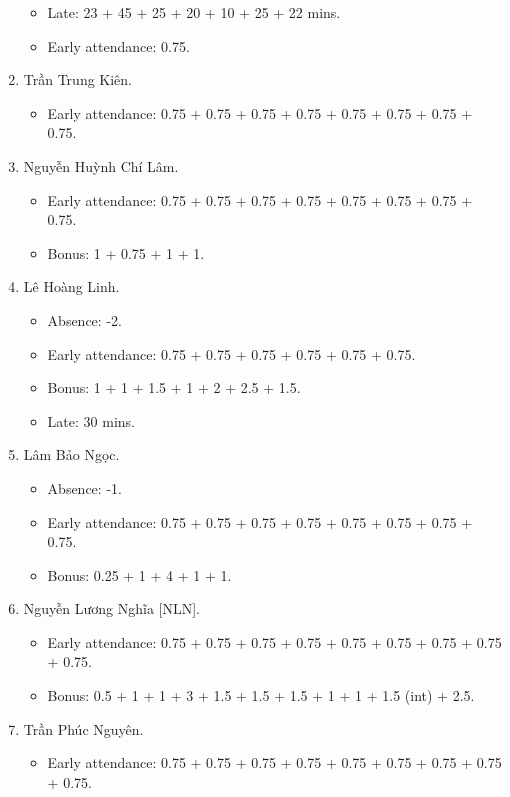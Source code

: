 \documentclass{article}
\begin{document}
\begin{enumerate}
	\begin{itemize}
		\item Late: 23 + 45 + 25 + 20 + 10 + 25 + 22 mins.
		\item Early attendance: 0.75.
	\end{itemize}
	\item {\sc Trần Trung Kiên.}
	\begin{itemize}
		\item Early attendance: 0.75 + 0.75 + 0.75 + 0.75 + 0.75 + 0.75 + 0.75 + 0.75.
	\end{itemize}
	\item {\sc Nguyễn Huỳnh Chí Lâm.}
	\begin{itemize}
		\item Early attendance: 0.75 + 0.75 + 0.75 + 0.75 + 0.75 + 0.75 + 0.75 + 0.75.
		\item Bonus: 1 + 0.75 + 1 + 1.
	\end{itemize}
	\item {\sc Lê Hoàng Linh.}
	\begin{itemize}
        \item Absence: -2.
		\item Early attendance: 0.75 + 0.75 + 0.75 + 0.75 + 0.75 + 0.75.
		\item Bonus: 1 + 1 + 1.5 + 1 + 2 + 2.5 + 1.5.
		\item Late: 30 mins.
	\end{itemize}
	\item {\sc Lâm Bảo Ngọc.}
	\begin{itemize}
		\item Absence: -1.
		\item Early attendance: 0.75 + 0.75 + 0.75 + 0.75 + 0.75 + 0.75 + 0.75 + 0.75.
		\item Bonus: 0.25 + 1 + 4 + 1 + 1.
	\end{itemize}
	\item {\sc Nguyễn Lương Nghĩa [NLN].}
	\begin{itemize}
		\item Early attendance: 0.75 + 0.75 + 0.75 + 0.75 + 0.75 + 0.75 + 0.75 + 0.75 + 0.75.
		\item Bonus: 0.5 + 1 + 1 + 3 + 1.5 + 1.5 + 1.5 + 1 + 1 + 1.5 (int) + 2.5.
	\end{itemize}
	\item {\sc Trần Phúc Nguyên.}
	\begin{itemize}
		\item Early attendance: 0.75 + 0.75 + 0.75 + 0.75 + 0.75 + 0.75 + 0.75 + 0.75 + 0.75.
	\end{itemize}

\end{enumerate}
\end{document}
